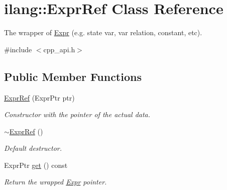 \hypertarget{classilang_1_1_expr_ref}{}\section{ilang\+:\+:Expr\+Ref Class Reference}
\label{classilang_1_1_expr_ref}


The wrapper of \mbox{\hyperlink{classilang_1_1_expr}{Expr}} (e.\+g. state var, var relation, constant, etc).  




{\ttfamily \#include $<$cpp\+\_\+api.\+h$>$}

\subsection*{Public Member Functions}
\begin{DoxyCompactItemize}
\item 
\mbox{\label{classilang_1_1_expr_ref_a6068122aa0b9dc8f187082fc581aa79e}} 
\mbox{\hyperlink{classilang_1_1_expr_ref_a6068122aa0b9dc8f187082fc581aa79e}{Expr\+Ref}} (Expr\+Ptr ptr)
\begin{DoxyCompactList}\small\item\em Constructor with the pointer of the actual data. \end{DoxyCompactList}\item 
\mbox{\label{classilang_1_1_expr_ref_a52585024b0540956d83d4efbda8df60e}} 
\mbox{\hyperlink{classilang_1_1_expr_ref_a52585024b0540956d83d4efbda8df60e}{$\sim$\+Expr\+Ref}} ()
\begin{DoxyCompactList}\small\item\em Default destructor. \end{DoxyCompactList}\item 
\mbox{\label{classilang_1_1_expr_ref_abd2560ff23db6ee0643c0d38535b5e12}} 
Expr\+Ptr \mbox{\hyperlink{classilang_1_1_expr_ref_abd2560ff23db6ee0643c0d38535b5e12}{get}} () const
\begin{DoxyCompactList}\small\item\em Return the wrapped \mbox{\hyperlink{classilang_1_1_expr}{Expr}} pointer. \end{DoxyCompactList}\item 
\mbox{\label{classilang_1_1_expr_ref_a5ec639324c61ffdc978be68e06a2b2ea}} 

\end{DoxyCompactItemize}
